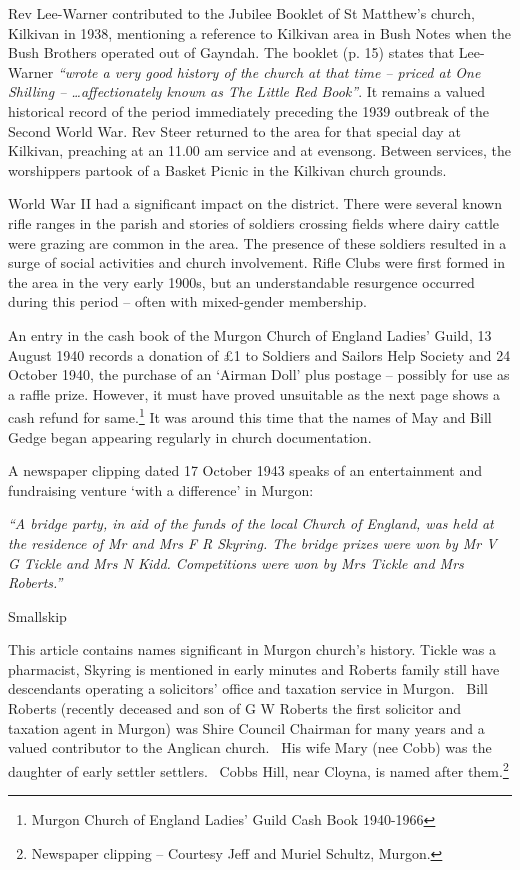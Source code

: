 Rev Lee-Warner contributed to the Jubilee Booklet of St Matthew's church, Kilkivan in 1938, mentioning a reference to Kilkivan area in Bush Notes when the Bush Brothers operated out of Gayndah. The booklet (p. 15) states that Lee-Warner \emph{``wrote a very good history of the church at that time -- priced at One Shilling -- \ldots affectionately known as The Little Red Book''}. It remains a valued historical record of the period immediately preceding the 1939 outbreak of the Second World War. Rev Steer returned to the area for that special day at Kilkivan, preaching at an 11.00 am service and at evensong. Between services, the worshippers partook of a Basket Picnic in the Kilkivan church grounds.

World War II had a significant impact on the district. There were several known rifle ranges in the parish and stories of soldiers crossing fields where dairy cattle were grazing are common in the area. The presence of these soldiers resulted in a surge of social activities and church involvement. Rifle Clubs were first formed in the area in the very early 1900s, but an understandable resurgence occurred during this period -- often with mixed-gender membership.

An entry in the cash book of the Murgon Church of England Ladies' Guild, 13 August 1940 records a donation of £1 to Soldiers and Sailors Help Society and 24 October 1940, the purchase of an `Airman Doll' plus postage -- possibly for use as a raffle prize. However, it must have proved unsuitable as the next page shows a cash refund for same.\footnote{Murgon Church of England Ladies' Guild Cash Book 1940-1966} It was around this time that the names of May and Bill Gedge began appearing regularly in church documentation.

A newspaper clipping dated 17 October 1943 speaks of an entertainment and fundraising venture `with a difference' in Murgon:

\emph{``A bridge party, in aid of the funds of the local Church of England, was held at the residence of Mr and Mrs F R Skyring. The bridge prizes were won by Mr V G Tickle and Mrs N Kidd. Competitions were won by Mrs Tickle and Mrs Roberts.''}

Smallskip

This article contains names significant in Murgon church's history. Tickle was a pharmacist, Skyring is mentioned in early minutes and Roberts family still have descendants operating a solicitors' office and taxation service in Murgon.~ Bill Roberts (recently deceased and son of G W Roberts the first solicitor and taxation agent in Murgon) was Shire Council Chairman for many years and a valued contributor to the Anglican church.~ His wife Mary (nee Cobb) was the daughter of early settler settlers.~ Cobbs Hill, near Cloyna, is named after them.\footnote{Newspaper clipping -- Courtesy Jeff and Muriel Schultz, Murgon.}

